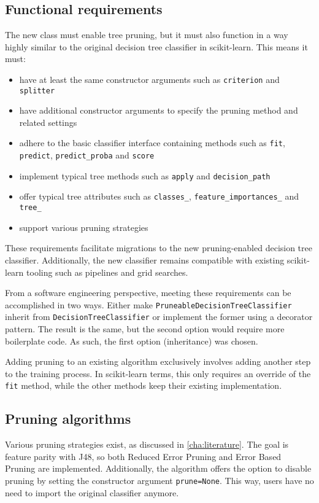 \subsection{Functional requirements}
The new class must enable tree pruning, but it must also function in a way highly similar to the original decision tree classifier in scikit-learn. This means it must:
\begin{itemize}
    \item have at least the same constructor arguments such as \texttt{criterion} and \texttt{splitter}
    \item have additional constructor arguments to specify the pruning method and related settings
    \item adhere to the basic classifier interface containing methods such as \texttt{fit}, \texttt{predict}, \texttt{predict\_proba} and \texttt{score}
    \item implement typical tree methods such as \texttt{apply} and \texttt{decision\_path}
    \item offer typical tree attributes such as \texttt{classes\_}, \texttt{feature\_importances\_} and \texttt{tree\_}
    \item support various pruning strategies
\end{itemize}

These requirements facilitate migrations to the new pruning-enabled decision tree classifier. Additionally, the new classifier remains compatible with existing scikit-learn tooling such as pipelines and grid searches.

From a software engineering perspective, meeting these requirements can be accomplished in two ways. Either make \texttt{PruneableDecisionTreeClassifier} inherit from \texttt{DecisionTreeClassifier} or implement the former using a decorator pattern. The result is the same, but the second option would require more boilerplate code. As such, the first option (inheritance) was chosen.

Adding pruning to an existing algorithm exclusively involves adding another step to the training process. In scikit-learn terms, this only requires an override of the \texttt{fit} method, while the other methods keep their existing implementation.

\subsection{Pruning algorithms}
Various pruning strategies exist, as discussed in \autoref{cha:literature}. The goal is feature parity with J48, so both Reduced Error Pruning and Error Based Pruning are implemented. Additionally, the algorithm offers the option to disable pruning by setting the constructor argument \texttt{prune=None}. This way, users have no need to import the original classifier anymore.

